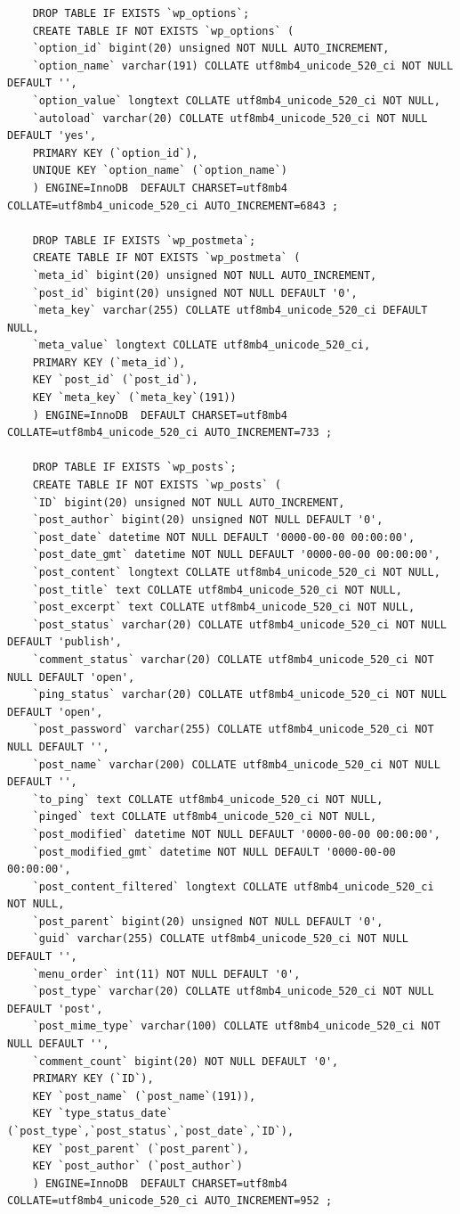 \documentclass[10pt,a4paper]{article}
\begin{document}
\begin{lstlisting}
	DROP TABLE IF EXISTS `wp_options`;
	CREATE TABLE IF NOT EXISTS `wp_options` (
	`option_id` bigint(20) unsigned NOT NULL AUTO_INCREMENT,
	`option_name` varchar(191) COLLATE utf8mb4_unicode_520_ci NOT NULL DEFAULT '',
	`option_value` longtext COLLATE utf8mb4_unicode_520_ci NOT NULL,
	`autoload` varchar(20) COLLATE utf8mb4_unicode_520_ci NOT NULL DEFAULT 'yes',
	PRIMARY KEY (`option_id`),
	UNIQUE KEY `option_name` (`option_name`)
	) ENGINE=InnoDB  DEFAULT CHARSET=utf8mb4 COLLATE=utf8mb4_unicode_520_ci AUTO_INCREMENT=6843 ;
	
	DROP TABLE IF EXISTS `wp_postmeta`;
	CREATE TABLE IF NOT EXISTS `wp_postmeta` (
	`meta_id` bigint(20) unsigned NOT NULL AUTO_INCREMENT,
	`post_id` bigint(20) unsigned NOT NULL DEFAULT '0',
	`meta_key` varchar(255) COLLATE utf8mb4_unicode_520_ci DEFAULT NULL,
	`meta_value` longtext COLLATE utf8mb4_unicode_520_ci,
	PRIMARY KEY (`meta_id`),
	KEY `post_id` (`post_id`),
	KEY `meta_key` (`meta_key`(191))
	) ENGINE=InnoDB  DEFAULT CHARSET=utf8mb4 COLLATE=utf8mb4_unicode_520_ci AUTO_INCREMENT=733 ;
	
	DROP TABLE IF EXISTS `wp_posts`;
	CREATE TABLE IF NOT EXISTS `wp_posts` (
	`ID` bigint(20) unsigned NOT NULL AUTO_INCREMENT,
	`post_author` bigint(20) unsigned NOT NULL DEFAULT '0',
	`post_date` datetime NOT NULL DEFAULT '0000-00-00 00:00:00',
	`post_date_gmt` datetime NOT NULL DEFAULT '0000-00-00 00:00:00',
	`post_content` longtext COLLATE utf8mb4_unicode_520_ci NOT NULL,
	`post_title` text COLLATE utf8mb4_unicode_520_ci NOT NULL,
	`post_excerpt` text COLLATE utf8mb4_unicode_520_ci NOT NULL,
	`post_status` varchar(20) COLLATE utf8mb4_unicode_520_ci NOT NULL DEFAULT 'publish',
	`comment_status` varchar(20) COLLATE utf8mb4_unicode_520_ci NOT NULL DEFAULT 'open',
	`ping_status` varchar(20) COLLATE utf8mb4_unicode_520_ci NOT NULL DEFAULT 'open',
	`post_password` varchar(255) COLLATE utf8mb4_unicode_520_ci NOT NULL DEFAULT '',
	`post_name` varchar(200) COLLATE utf8mb4_unicode_520_ci NOT NULL DEFAULT '',
	`to_ping` text COLLATE utf8mb4_unicode_520_ci NOT NULL,
	`pinged` text COLLATE utf8mb4_unicode_520_ci NOT NULL,
	`post_modified` datetime NOT NULL DEFAULT '0000-00-00 00:00:00',
	`post_modified_gmt` datetime NOT NULL DEFAULT '0000-00-00 00:00:00',
	`post_content_filtered` longtext COLLATE utf8mb4_unicode_520_ci NOT NULL,
	`post_parent` bigint(20) unsigned NOT NULL DEFAULT '0',
	`guid` varchar(255) COLLATE utf8mb4_unicode_520_ci NOT NULL DEFAULT '',
	`menu_order` int(11) NOT NULL DEFAULT '0',
	`post_type` varchar(20) COLLATE utf8mb4_unicode_520_ci NOT NULL DEFAULT 'post',
	`post_mime_type` varchar(100) COLLATE utf8mb4_unicode_520_ci NOT NULL DEFAULT '',
	`comment_count` bigint(20) NOT NULL DEFAULT '0',
	PRIMARY KEY (`ID`),
	KEY `post_name` (`post_name`(191)),
	KEY `type_status_date` (`post_type`,`post_status`,`post_date`,`ID`),
	KEY `post_parent` (`post_parent`),
	KEY `post_author` (`post_author`)
	) ENGINE=InnoDB  DEFAULT CHARSET=utf8mb4 COLLATE=utf8mb4_unicode_520_ci AUTO_INCREMENT=952 ;
	

\end{lstlisting}
\end{document}
